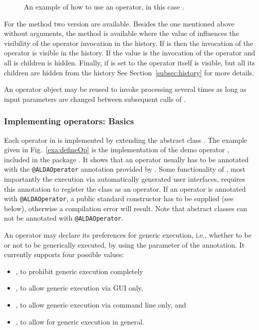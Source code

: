 \begin{figure}[hb]

\caption{\label{exa:useop}An example of how to use an operator, in this case
	.}
\end{figure}

For the  method two version are available.
Besides the one mentioned above without arguments,
the method  is available where the value of
 influences the visibility of the operator invocation in the
history.
If  is  then the invocation of the operator
is visible in the history.
If the value is  the invocation of the operator and all is children is hidden.
Finally, if  is set to  the operator itself is visible,
but all its children are hidden from the history
See Section~\ref{subsec:history} for more details.

An operator object may be reused to invoke processing
several times as long as input parameters are changed between
subsequent calls of .

\subsubsection{Implementing operators: Basics}
\label{subsubsec:implOperators-basics}

Each operator in \alida is implemented by extending the abstract class .
The example given in Fig.~\ref{exa:defineOp}
is the implementation of the demo operator ,
included in the package .
It
shows
that an operator usually has to be annotated with the \texttt{@ALDAOperator}
annotation provided by \alida.
Some functionality of \alida, most importantly the  execution via automatically generated user interfaces,
 requires this annotation
to register the class as an \alida operator.
If an operator is annotated with \texttt{@ALDAOperator}, a public standard
constructor has to be supplied (see below), otherwise a compilation error will result.
Note that abstract classes can not be annotated with \texttt{@ALDAOperator}.

An operator may declare its preferences for generic execution, i.e., whether to
be or not to be generically executed, by using the parameter
 of the annotation. It currently supports four
possible values:
\begin{itemize}
\item {}, to prohibit generic execution completely
\item {}, to allow generic execution via GUI only,
\item {}, to allow generic execution via command line only, and
\item {}, to allow for generic execution in general.
\end{itemize}

